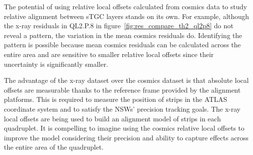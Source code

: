 The potential of using relative local offsets calculated from cosmics data to study relative alignment between sTGC layers stands on its own. For example, although the x-ray residuals in QL2.P.8 in figure~\ref{fig:res_compare_th2_ql2p8} do not reveal a pattern, the variation in the mean cosmics residuals do. Identifying the pattern is possible because mean cosmics residuals can be calculated across the entire area and are sensitive to smaller relative local offsets since their uncertainty is significantly smaller. 

The advantage of the x-ray dataset over the cosmics dataset is that absolute local offsets are measurable thanks to the reference frame provided by the alignment platforms. This is required to measure the position of strips in the ATLAS coordinate system and to satisfy the NSWs' precision tracking goals. The x-ray local offsets are being used to build an alignment model of strips in each quadruplet. It is compelling to imagine using the cosmics relative local offsets to improve the model considering their precision and ability to capture effects across the entire area of the quadruplet.